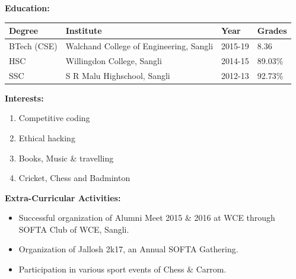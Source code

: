 \documentclass[11pt]{article}
\begin{document}
\begin{center}
\begin{LARGE}
			\textbf{Education:}
			\medskip%
			\begin{tabu} to \textwidth {|X[l]|X[4]|X[c]|X[c]|}
				\toprule
			   	\textbf{Degree} & \textbf{Institute} & \textbf{Year} & \textbf{Grades}\\
			   \hline
			   BTech (CSE) & Walchand College of Engineering, Sangli & 2015-19 & 8.36\\
			   \hline
			   HSC & Willingdon College, Sangli & 2014-15 & 89.03\%\\
			   \hline
			   SSC & S R Malu Highschool, Sangli & 2012-13 & 92.73\%\\
			   \bottomrule
			\end{tabu}
		\end{LARGE}
		\begin{minipage}[t]{0.35\textwidth}
			\raggedright\smallskip
			\begin{LARGE}
				\textbf{Interests:}\medskip%
				{\small
					\begin{enumerate}[label=(\alph*)]
						\item Competitive coding
						\item Ethical hacking
						\item Books, Music \& travelling
						\item Cricket, Chess and Badminton
					\end{enumerate}
				}
			\end{LARGE}
		\end{minipage}%
		\begin{minipage}[t]{0.65\textwidth}
			\raggedright\smallskip
			\begin{LARGE}
				\textbf{Extra-Curricular Activities:}\medskip%
				{\small
					\begin{itemize}
						\item Successful organization of Alumni Meet 2015 \& 2016 at WCE through SOFTA Club of WCE, Sangli.
						\item Organization of Jallosh 2k17, an Annual SOFTA Gathering.
						\item Participation in various sport events of Chess \& Carrom.
					\end{itemize}
				}
			\end{LARGE}								
		\end{minipage}
		\linebreak\linebreak\linebreak\linebreak
		\begin{minipage}[t]{0.36\textwidth}

\end{minipage}
\end{center}
\end{document}
